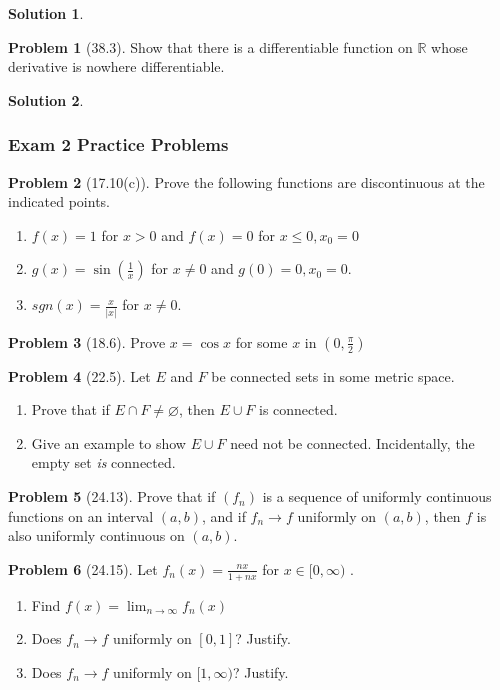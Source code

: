 \documentclass[12pt]{article}
\theoremstyle{definition} %
\newtheorem{solution}{Solution}
\newtheorem{problem}{Problem}
\theoremstyle{plain} %
\begin{document}
\begin{solution}
    
\end{solution}
\begin{problem}[38.3]
Show that there is a differentiable function on $\mathbb{R}$ whose derivative is nowhere differentiable.
\end{problem}
\begin{solution}
    
\end{solution}
\subsubsection*{Exam 2 Practice Problems}
\begin{problem}[17.10(c)]
    Prove the following functions are discontinuous at the indicated points. 
    \begin{enumerate}
        \item $f(x)=1$ for $x>0$ and $f(x)=0$ for $x\leq 0,x_0=0$ 
        \item $g(x)=\sin(\frac{1}{x})$ for $x\neq 0$ and $g(0)=0,x_0=0$.
        \item $sgn(x)=\frac{x}{\left\vert x \right\vert }$ for $x\neq 0$.    
    \end{enumerate}
\end{problem}
\begin{problem}[18.6]
    Prove $x=\cos x$ for some $x$ in $(0,\frac{\pi}{2})$ 
\end{problem}
\begin{problem}[22.5]
   Let $E$ and $F$ be connected sets in some metric space.
   \begin{enumerate}
    \item Prove that if $E\cap F\neq \varnothing $, then $E\cup F$ is connected.
    \item Give an example to show $E \cup  F$ need not be connected. Incidentally, the empty set \emph{is} connected.   
   \end{enumerate} 
\end{problem}
\begin{problem}[24.13]
   Prove that if $(f_{n})$ is a sequence of uniformly continuous functions on an interval $(a,b)$, and if $f_{n}\to f$ uniformly on $(a,b)$, then $f$ is also uniformly continuous on $(a,b)$.
\end{problem}
\begin{problem}[24.15]
    Let $f_{n}(x)=\frac{nx}{1+nx}$ for $x\in [0,\infty )$ .
    \begin{enumerate}
        \item Find $f(x)=\lim_{n \to \infty} f_{n}(x)$ 
        \item Does $f_{n}\to f$ uniformly on $[0,1]$? Justify.
        \item Does $f_{n}\to f$ uniformly on $[1,\infty )$? Justify.  
    \end{enumerate}
\end{problem}
\end{document}
